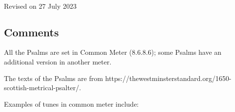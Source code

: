 
\begin{center}
\Huge {}\vspace{24pt}\\
\Large {}
\end{center}


\begin{center}
\Large Revised on 27 July 2023
\end{center}


\newpage 
\begin{center}
\Huge {}
\end{center}

\subsection*{Comments}

All the Psalms are set in Common Meter (8.6.8.6); some Psalms have an additional version in another meter.

The texts of the Psalms are from https://thewestminsterstandard.org/1650-scottish-metrical-psalter/.

Examples of tunes in common meter include:

